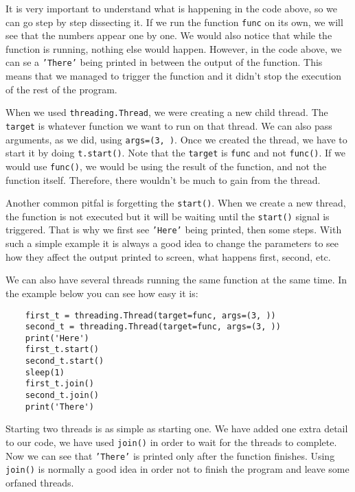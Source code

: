 It is very important to understand what is happening in the code above, so we can go step by step dissecting it. If we run the function \texttt{func} on its own, we will see that the numbers appear one by one. We would also notice that while the function is running, nothing else would happen. However, in the code above, we can se a \texttt{'There'} being printed in between the output of the function. This means that we managed to trigger the function and it didn't stop the execution of the rest of the program.

When we used \texttt{threading.Thread}, we were creating a new child thread. The \texttt{target} is whatever function we want to run on that thread. We can also pass arguments, as we did, using \texttt{args=(3, )}. Once we created the thread, we have to start it by doing \texttt{t.start()}. Note that the \texttt{target} is \texttt{func} and not \texttt{func()}. If we would use \texttt{func()}, we would be using the result of the function, and not the function itself. Therefore, there wouldn't be much to gain from the thread.


Another common pitfal is forgetting the \texttt{start()}. When we create a new thread, the function is not executed but it will be waiting until the \texttt{start()} signal is triggered. That is why we first see \texttt{'Here'} being printed, then some steps. With such a simple example it is always a good idea to change the parameters to see how they affect the output printed to screen, what happens first, second, etc.

We can also have several threads running the same function at the same time. In the example below you can see how easy it is:

\begin{verbatim}
    first_t = threading.Thread(target=func, args=(3, ))
    second_t = threading.Thread(target=func, args=(3, ))
    print('Here')
    first_t.start()
    second_t.start()
    sleep(1)
    first_t.join()
    second_t.join()
    print('There')
\end{verbatim}

Starting two threads is as simple as starting one. We have added one extra detail to our code, we have used \texttt{join()} in order to wait for the threads to complete. Now we can see that \texttt{'There'} is printed only after the function finishes. Using \texttt{join()} is normally a good idea in order not to finish the program and leave some orfaned threads.

